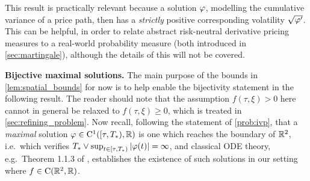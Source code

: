 This result is practically relevant because a solution $\varphi$, modelling the cumulative variance of a price path, then has a \emph{strictly} positive corresponding volatility $\sqrt{\varphi'}$. This can be helpful, in order to relate abstract risk-neutral derivative pricing measures to a real-world probability measure (both introduced in \autoref{sec:martingale}), although the details of this will not be covered.

\vspace{3mm}\textbf{Bijective maximal solutions.} The main purpose of the bounds in \autoref{lem:spatial_bounds} for now is to help enable the bijectivity statement in the following result. The reader should note that the assumption $f(\tau,\xi)>0$ here cannot in general be relaxed to $f(\tau,\xi)\ge0$, which is treated in \autoref{sec:refining_problem}. Now recall, following the statement of \autoref{prob:ivp}, that a \emph{maximal} solution $\varphi\in\mathrm{C}^1([\tau,T_*),\mathbb{R})$ is one which reaches the boundary of $\mathbb{R}^2$, i.e.~which verifies $T_*\vee\sup_{t\in[\tau,T_*)}|\varphi(t)|=\infty$, and classical ODE theory, e.g.~Theorem 1.1.3 of \cite{lakshmikantham_1969}, establishes the existence of such solutions in our setting where $f\in\mathrm{C}(\mathbb{R}^2,\mathbb{R})$.

